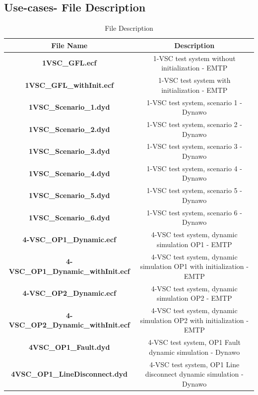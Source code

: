 \documentclass{report}
\begin{document}
\subsection{Use-cases- File Description}
\begin{table}[H]
 \caption{File Description}
    \centering
    \begin{tabular}{|c|c|}
    \hline
         File Name & Description  \\
         \hline
         \textbf{1VSC\_GFL.ecf} & 1-VSC test system without initialization - EMTP \\
         \hline 
         \textbf{1VSC\_GFL\_withInit.ecf} & 1-VSC test system with initialization - EMTP \\
         \hline 
         \textbf{1VSC\_Scenario\_1.dyd} & 1-VSC test system, scenario 1 - Dynawo\\
         \hline 
         \textbf{1VSC\_Scenario\_2.dyd} & 1-VSC test system, scenario 2 - Dynawo\\
         \hline 
         \textbf{1VSC\_Scenario\_3.dyd} & 1-VSC test system, scenario 3 - Dynawo\\
         \hline 
         \textbf{1VSC\_Scenario\_4.dyd} & 1-VSC test system, scenario 4 - Dynawo\\
         \hline 
         \textbf{1VSC\_Scenario\_5.dyd} & 1-VSC test system, scenario 5 - Dynawo\\
         \hline 
         \textbf{1VSC\_Scenario\_6.dyd} & 1-VSC test system, scenario 6 - Dynawo\\
         \hline 
         \textbf{4-VSC\_OP1\_Dynamic.ecf} & 4-VSC test system, dynamic simulation OP1 - EMTP\\
         \hline 
         \textbf{4-VSC\_OP1\_Dynamic\_withInit.ecf} & 4-VSC test system, dynamic simulation OP1 with initialization - EMTP\\
         \hline 
         \textbf{4-VSC\_OP2\_Dynamic.ecf} & 4-VSC test system, dynamic simulation OP2 - EMTP\\
         \hline 
         \textbf{4-VSC\_OP2\_Dynamic\_withInit.ecf} & 4-VSC test system, dynamic simulation OP2 with initialization - EMTP\\
         \hline 
         \textbf{4VSC\_OP1\_Fault.dyd} & 4-VSC test system, OP1 Fault dynamic simulation - Dynawo\\
         \hline 
         \textbf{4VSC\_OP1\_LineDisconnect.dyd} & 4-VSC test system, OP1 Line disconnect dynamic simulation - Dynawo\\
         \hline 

\end{tabular}
\end{table}
\end{document}
